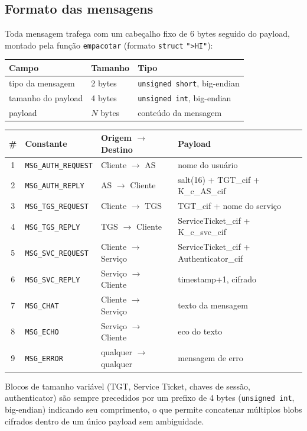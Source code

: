 \documentclass[11pt,a4paper]{article}
\begin{document}
\subsection{Formato das mensagens}

Toda mensagem trafega com um cabeçalho fixo de 6 bytes seguido do payload, montado
pela função \texttt{empacotar} (formato \texttt{struct} \texttt{">HI"}):

\begin{center}
\begin{tabular}{@{}lll@{}}
\toprule
Campo & Tamanho & Tipo \\
\midrule
tipo da mensagem & 2 bytes & \texttt{unsigned short}, big-endian \\
tamanho do payload & 4 bytes & \texttt{unsigned int}, big-endian \\
payload & $N$ bytes & conteúdo da mensagem \\
\bottomrule
\end{tabular}
\end{center}

\begin{center}
\small
\begin{tabular}{@{}clll@{}}
\toprule
\# & Constante & Origem $\to$ Destino & Payload \\
\midrule
1 & \texttt{MSG\_AUTH\_REQUEST} & Cliente $\to$ AS & nome do usuário \\
2 & \texttt{MSG\_AUTH\_REPLY} & AS $\to$ Cliente & salt(16) + TGT\_cif + K\_c\_AS\_cif \\
3 & \texttt{MSG\_TGS\_REQUEST} & Cliente $\to$ TGS & TGT\_cif + nome do serviço \\
4 & \texttt{MSG\_TGS\_REPLY} & TGS $\to$ Cliente & ServiceTicket\_cif + K\_c\_svc\_cif \\
5 & \texttt{MSG\_SVC\_REQUEST} & Cliente $\to$ Serviço & ServiceTicket\_cif + Authenticator\_cif \\
6 & \texttt{MSG\_SVC\_REPLY} & Serviço $\to$ Cliente & timestamp+1, cifrado \\
7 & \texttt{MSG\_CHAT} & Cliente $\to$ Serviço & texto da mensagem \\
8 & \texttt{MSG\_ECHO} & Serviço $\to$ Cliente & eco do texto \\
9 & \texttt{MSG\_ERROR} & qualquer $\to$ qualquer & mensagem de erro \\
\bottomrule
\end{tabular}
\end{center}

Blocos de tamanho variável (TGT, Service Ticket, chaves de sessão, authenticator) são
sempre precedidos por um prefixo de 4 bytes (\texttt{unsigned int}, big-endian) indicando
seu comprimento, o que permite concatenar múltiplos blobs cifrados dentro de um único
payload sem ambiguidade.
\end{document}
